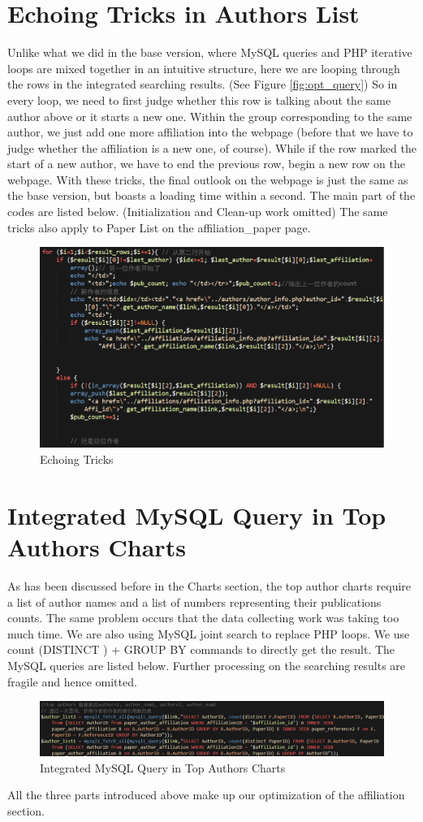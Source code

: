 \documentclass{book}
\begin{document}
\section{Echoing Tricks in Authors List}

Unlike what we did in the base version, where MySQL queries and PHP iterative loops are mixed together in an intuitive structure, here we are looping through the rows in the integrated searching results. (See Figure \ref{fig:opt_query}) So in every loop, we need to first judge whether this row is talking about the same author above or it starts a new one. Within the group corresponding to the same author, we just add one more affiliation into the webpage (before that we have to judge whether the affiliation is a new one, of course). While if the row marked the start of a new author, we have to end the previous row, begin a new row on the webpage. With these tricks, the final outlook on the webpage is just the same as the base version, but boasts a loading time within a second. The main part of the codes are listed below. (Initialization and Clean-up work omitted) The same tricks also apply to Paper List on the affiliation\_paper page. 


\begin{figure}[H]
\centering{}
\includegraphics[scale=0.45]{img/zlt_opt_code_advanced.png}
\caption{Echoing Tricks}
\end{figure}

\section{Integrated MySQL Query in Top Authors Charts}

As has been discussed before in the Charts section, the top author charts require a list of author names and a list of numbers representing their publications counts. The same problem occurs that the data collecting work was taking too much time. We are also using MySQL joint search to replace PHP loops. We use count (DISTINCT ) + GROUP BY commands to directly get the result. The MySQL queries are listed below. Further processing on the searching results are fragile and hence omitted. 

\begin{figure}[H]
\centering{}
\includegraphics[scale=0.55]{img/zlt_opt_code_chart.png}
\caption{Integrated MySQL Query in Top Authors Charts}
\end{figure}

All the three parts introduced above make up our optimization of the affiliation section.
\end{document}
